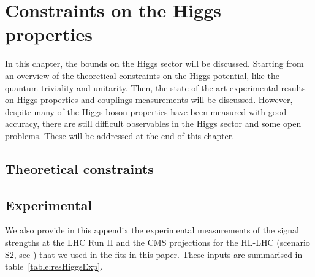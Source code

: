 \chapter{Constraints on the Higgs properties }\label{chap:HiggsConstr}
In this chapter, the bounds on the Higgs sector will be discussed. Starting from an overview of the theoretical constraints on the Higgs potential, like the quantum triviality and unitarity. Then, the state-of-the-art experimental results on Higgs properties and couplings measurements will be discussed. However, despite many of the Higgs boson properties have been measured with good accuracy, there are still difficult observables in the Higgs sector and some open problems. These will be addressed at the end of this chapter.   
\section{Theoretical constraints}


\section{Experimental}
We also provide in this appendix the experimental measurements of the signal strengths at the LHC Run II and the CMS projections for the HL-LHC (scenario S2, see \cite{Cepeda:2019klc}) that we used in the fits in this paper. These inputs are summarised in table~\ref{table:resHiggsExp}.
\newpage
\begingroup
 
\endgroup